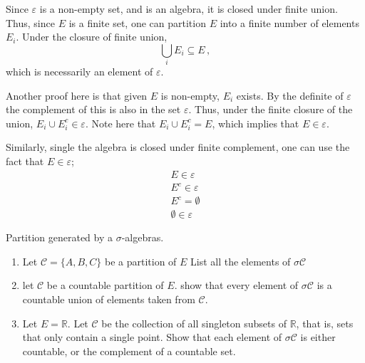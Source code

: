 \begin{solution}
	Since $\varepsilon$ is a non-empty set, and is an algebra, it is closed under finite union. Thus, since $E$ is a finite set, one can partition $E$ into a finite number of elements $E_i$. Under the closure of finite union, 
	\begin{equation}
		\bigcup_i E_i \subseteq E\,,
	\end{equation}
	which is necessarily an element of $\varepsilon$.

	Another proof here is that given $E$ is non-empty, $E_i$ exists. By the definite of $\varepsilon$ the complement of this is also in the set $\varepsilon$. Thus, under the finite closure of the union, $E_i \cup E_i^c \in \varepsilon$. Note here that $E_i \cup E_i^c = E$, which implies that $E\in \varepsilon$.

	Similarly, single the algebra is closed under finite complement, one can use the fact that $E\in \varepsilon$;
	\begin{align*}
		E\in \varepsilon\\
		E^c \in \varepsilon\\
		E^c = \emptyset\\
		\emptyset \in \varepsilon
	\end{align*}
\end{solution}

\begin{problem}
	Partition generated by a $\sigma$-algebras.
	\begin{enumerate}
		\item Let $\mathcal{C} = \{A,B,C\}$ be a partition of $E$ List all the elements of $\sigma \mathcal{C}$
		\item let $\mathcal{C}$ be a countable partition of $E$. show that every element of $\sigma \mathcal{C}$ is a countable union of elements taken from $\mathcal{C}$.
		\item Let $E = \mathbb{R}$. Let $\mathcal{C}$ be the collection of all singleton subsets of $\mathbb{R}$, that is, sets that only contain a single point. Show that each element of $\sigma \mathcal{C}$ is either countable, or the complement of a countable set.  
	\end{enumerate}
\end{problem}

